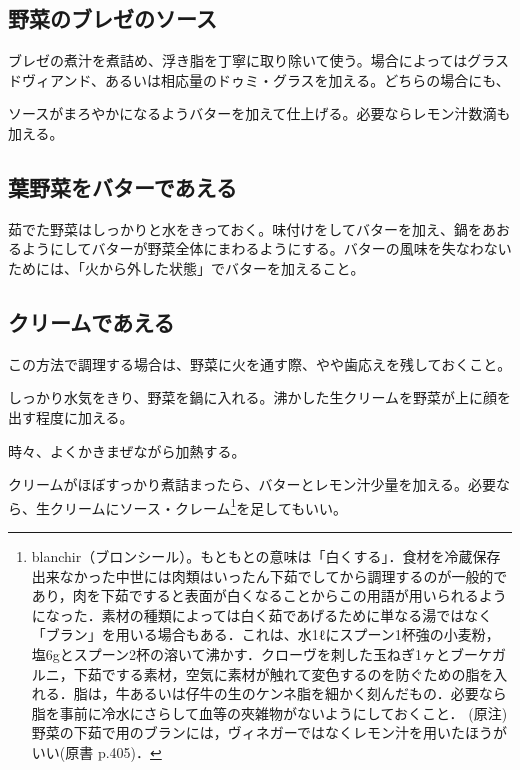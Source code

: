 \hypertarget{sauce-des-legumes-braises}{%
\subsection{野菜のブレゼのソース}\label{sauce-des-legumes-braises}}

ブレゼの煮汁を煮詰め、浮き脂を丁寧に取り除いて使う。場合によってはグラスドヴィアンド、あるいは相応量のドゥミ・グラスを加える。どちらの場合にも、

ソースがまろやかになるようバターを加えて仕上げる。必要ならレモン汁数滴も加える。

\hypertarget{liaison-des-legumes-vert-au-beurre}{%
\subsection{葉野菜をバターであえる}\label{liaison-des-legumes-vert-au-beurre}}

茹でた野菜はしっかりと水をきっておく。味付けをしてバターを加え、鍋をあおるようにしてバターが野菜全体にまわるようにする。バターの風味を失なわないためには、「火から外した状態」でバターを加えること。

\hypertarget{liaison-des-legumes-a-la-creme}{%
\subsection{クリームであえる}\label{liaison-des-legumes-a-la-creme}}

この方法で調理する場合は、野菜に火を通す際、やや歯応えを残しておくこと。

しっかり水気をきり、野菜を鍋に入れる。沸かした生クリームを野菜が上に顔を出す程度に加える。

時々、よくかきまぜながら加熱する。

クリームがほぼすっかり煮詰まったら、バターとレモン汁少量を加える。必要なら、生クリームにソース・クレーム\footnote{blanchir（ブロンシール）。もともとの意味は「白くする」．食材を冷蔵保存出来なかった中世には肉類はいったん下茹でしてから調理するのが一般的であり，肉を下茹ですると表面が白くなることからこの用語が用いられるようになった．素材の種類によっては白く茹であげるために単なる湯ではなく「ブラン」を用いる場合もある．これは、水1ℓにスプーン1杯強の小麦粉，塩6gとスプーン2杯の溶いて沸かす．クローヴを刺した玉ねぎ1ヶとブーケガルニ，下茹でする素材，空気に素材が触れて変色するのを防ぐための脂を入れる．脂は，牛あるいは仔牛の生のケンネ脂を細かく刻んだもの．必要なら脂を事前に冷水にさらして血等の夾雑物がないようにしておくこと．
  (原注)
  野菜の下茹で用のブランには，ヴィネガーではなくレモン汁を用いたほうがいい(原書
  p.405)．}を足してもいい。

